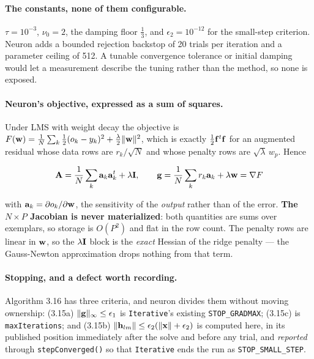 \paragraph{The constants, none of them configurable.}
$\tau = 10^{-3}$, $\nu_0 = 2$, the damping floor $\frac{1}{3}$, and
$\epsilon_2 = 10^{-12}$ for the small-step criterion.  Neuron adds a bounded
rejection backstop of 20 trials per iteration and a parameter ceiling of 512.
A tunable convergence tolerance or initial damping would let a measurement
describe the tuning rather than the method, so none is exposed.

\paragraph{Neuron's objective, expressed as a sum of squares.}  Under LMS with
weight decay the objective is
$F({\bf w}) = \frac{1}{N}\sum_k \frac{1}{2}(o_k - y_k)^2 + \frac{\lambda}{2}\|{\bf w}\|^2$,
which is exactly $\frac{1}{2}{\bf f}^t{\bf f}$ for an augmented residual whose
data rows are $r_k/\sqrt{N}$ and whose penalty rows are
$\sqrt{\lambda}\,w_p$.  Hence

\[
{\bf A} = \frac{1}{N}\sum_k {\bf a}_k{\bf a}_k^t + \lambda{\bf I},
\qquad
{\bf g} = \frac{1}{N}\sum_k r_k{\bf a}_k + \lambda{\bf w} = \nabla F
\]

with ${\bf a}_k = \partial o_k / \partial {\bf w}$, the sensitivity of the
{\em output} rather than of the error.  {\bf The $N\times P$ Jacobian is never
materialized}: both quantities are sums over exemplars, so storage is $O(P^2)$
and flat in the row count.  The penalty rows are linear in ${\bf w}$, so the
$\lambda{\bf I}$ block is the {\em exact} Hessian of the ridge penalty --- the
Gauss-Newton approximation drops nothing from that term.

\paragraph{Stopping, and a defect worth recording.}  Algorithm 3.16 has three
criteria, and neuron divides them without moving ownership:
(3.15a) $\|{\bf g}\|_\infty \le \epsilon_1$ is \texttt{Iterative}'s existing
\texttt{STOP\_GRADMAX}; (3.15c) is \texttt{maxIterations}; and
(3.15b) $\|{\bf h}_{lm}\| \le \epsilon_2(\|{\bf x}\| + \epsilon_2)$ is computed
here, in its published position immediately after the solve and before any trial,
and {\em reported} through \texttt{stepConverged()} so that \texttt{Iterative}
ends the run as \texttt{STOP\_SMALL\_STEP}.

